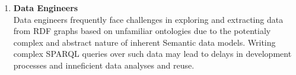 \begin{enumerate}
  \item \textbf{Data Engineers}\\
    Data engineers frequently face challenges in exploring and extracting data from RDF graphs based on unfamiliar ontologies due to the potentialy complex and abstract nature of inherent Semantic data models.
    Writing complex SPARQL queries over such data may lead to delays in development processes and inneficient data analyses and reuse. 
\end{enumerate}


